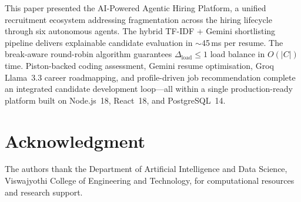 \documentclass[conference]{IEEEtran}
\begin{document}
This paper presented the AI-Powered Agentic Hiring Platform, a unified recruitment ecosystem addressing fragmentation across the hiring lifecycle through six autonomous agents. The hybrid TF-IDF + Gemini shortlisting pipeline delivers explainable candidate evaluation in $\sim$45\,ms per resume. The break-aware round-robin algorithm guarantees $\Delta_{\text{load}} \leq 1$ load balance in $O(|C|)$ time. Piston-backed coding assessment, Gemini resume optimisation, Groq Llama~3.3 career roadmapping, and profile-driven job recommendation complete an integrated candidate development loop—all within a single production-ready platform built on Node.js~18, React~18, and PostgreSQL~14.

\section*{Acknowledgment}

The authors thank the Department of Artificial Intelligence and Data Science, Viswajyothi College of Engineering and Technology, for computational resources and research support.
\end{document}
